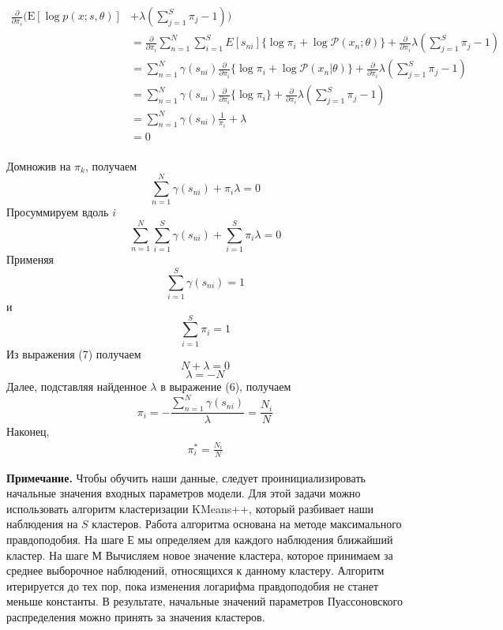 \documentclass{matmex-diploma-custom}
\begin{document}
\begin{align*}
\frac{\partial}{\partial \pi_i}( \mathrm{E}[\log p(x;s,\theta)] &+ \lambda(\sum_{j=1}^S \pi_j - 1))
\\&= \frac{\partial}{\partial \pi_i}\sum_{n=1}^N \sum_{i=1}^S
E[s_{ni}]\{\log \pi_i + \log \mathcal{P}(x_n;\theta)\} + \frac{\partial}{\partial \pi_i}\lambda(\sum_{j=1}^S \pi_j - 1)
\\& = \sum_{n=1}^N
\gamma(s_{ni})\frac{\partial}{\partial \pi_i}\{\log \pi_i + \log \mathcal{P}(x_n|\theta)\} + \frac{\partial}{\partial \pi_i} \lambda(\sum_{j=1}^S \pi_j - 1)\\
&=\sum_{n=1}^N
\gamma(s_{ni})\frac{\partial}{\partial \pi_i}\{\log \pi_i\} + \frac{\partial}{\partial \pi_i} \lambda(\sum_{j=1}^S \pi_j - 1) \\
&=\sum_{n=1}^N
\gamma(s_{ni})\frac{1}{\pi_i} + \lambda \\&= 0
\end{align*}
\\
Домножив на $\pi_k$, получаем
\begin{equation}
\sum_{n=1}^N \gamma(s_{ni}) + \pi_i \lambda = 0
\end{equation}
Просуммируем вдоль $i$
\begin{equation}
\sum_{n=1}^N \sum_{i=1}^S \gamma(s_{ni}) + \sum_{i=1}^S \pi_i \lambda = 0
\end{equation}
Применяя
$$\sum_{i=1}^S \gamma(s_{ni}) = 1$$
и
$$\sum_{i=1}^S \pi_i = 1$$
Из выражения (7) получаем
$$N + \lambda = 0$$
$$\lambda = -N$$
Далее, подставляя найденное $\lambda$ в выражение (6), получаем
$$\pi_i = - \frac{\sum_{n=1}^N\gamma(s_{ni})}{\lambda} = \frac{N_i}{N}$$
Наконец,
\begin{align}
\pi_{i}^* = \frac{N_i}{N} 
\end{align}

\textbf{Примечание.} Чтобы обучить наши данные, следует проинициализировать начальные значения входных параметров модели. Для этой задачи можно использовать алгоритм кластеризации KMeans++\cite{book:murphy}, который разбивает наши наблюдения на $S$ кластеров. Работа алгоритма основана на методе максимального правдоподобия. На шаге Е мы определяем для каждого наблюдения ближайший кластер. На шаге М Вычисляем новое значение кластера, которое принимаем за среднее выборочное наблюдений, относящихся к данному кластеру. Алгоритм итерируется до тех пор, пока изменения логарифма правдоподобия не станет меньше константы. В результате, начальные значений параметров Пуассоновского распределения можно принять за значения кластеров.
\end{document}
